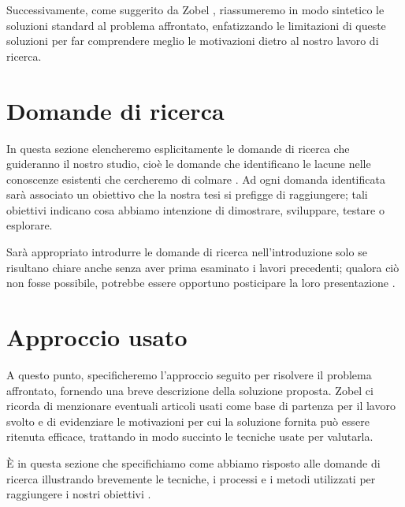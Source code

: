 Successivamente, come suggerito da Zobel \cite{zobel2015writing}, riassumeremo in modo sintetico le soluzioni standard al problema affrontato, enfatizzando le limitazioni di queste soluzioni per far comprendere meglio le motivazioni dietro al nostro lavoro di ricerca.

\section{Domande di ricerca}

In questa sezione elencheremo esplicitamente le domande di ricerca che guideranno il nostro studio, cioè le domande che identificano le lacune nelle conoscenze esistenti che cercheremo di colmare \cite{pfandzelter2022thesis}. Ad ogni domanda identificata sarà associato un obiettivo che la nostra tesi si prefigge di raggiungere; tali obiettivi indicano cosa abbiamo intenzione di dimostrare, sviluppare, testare o esplorare.

\medskip

Sarà appropriato introdurre le domande di ricerca nell'introduzione solo se risultano chiare anche senza aver prima esaminato i lavori precedenti; qualora ciò non fosse possibile, potrebbe essere opportuno posticipare la loro presentazione \cite{mannisto2022guide}.

\section{Approccio usato}

A questo punto, specificheremo l'approccio seguito per risolvere il problema affrontato, fornendo una breve descrizione della soluzione proposta. Zobel \cite{zobel2015writing} ci ricorda di menzionare eventuali articoli usati come base di partenza per il lavoro svolto e di evidenziare le motivazioni per cui la soluzione fornita può essere ritenuta efficace, trattando in modo succinto le tecniche usate per valutarla.

\medskip

È in questa sezione che specifichiamo come abbiamo risposto alle domande di ricerca illustrando brevemente le tecniche, i processi e i metodi utilizzati per raggiungere i nostri obiettivi \cite{pfandzelter2022thesis}.

